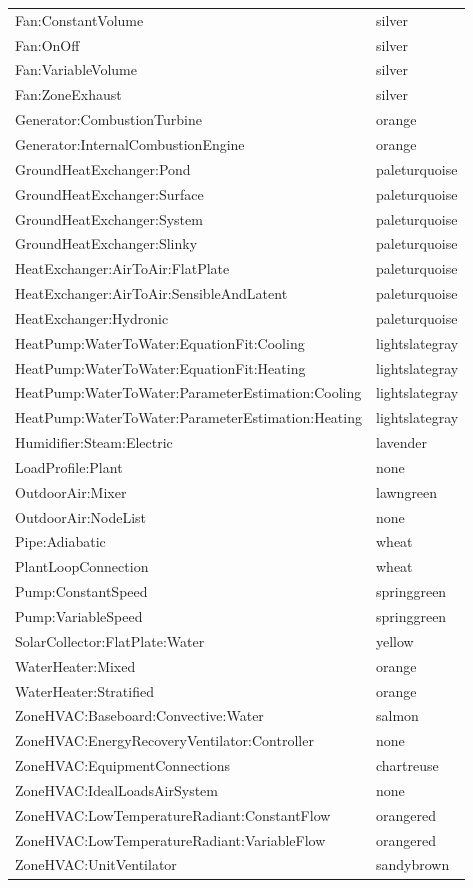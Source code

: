 \begin{longtable}[c]{@{}ll@{}}
Fan:ConstantVolume & silver \tabularnewline
Fan:OnOff & silver \tabularnewline
Fan:VariableVolume & silver \tabularnewline
Fan:ZoneExhaust & silver \tabularnewline
Generator:CombustionTurbine & orange \tabularnewline
Generator:InternalCombustionEngine & orange \tabularnewline
GroundHeatExchanger:Pond & paleturquoise \tabularnewline
GroundHeatExchanger:Surface & paleturquoise \tabularnewline
GroundHeatExchanger:System & paleturquoise \tabularnewline
GroundHeatExchanger:Slinky & paleturquoise \tabularnewline
HeatExchanger:AirToAir:FlatPlate & paleturquoise \tabularnewline
HeatExchanger:AirToAir:SensibleAndLatent & paleturquoise \tabularnewline
HeatExchanger:Hydronic & paleturquoise \tabularnewline
HeatPump:WaterToWater:EquationFit:Cooling & lightslategray \tabularnewline
HeatPump:WaterToWater:EquationFit:Heating & lightslategray \tabularnewline
HeatPump:WaterToWater:ParameterEstimation:Cooling & lightslategray \tabularnewline
HeatPump:WaterToWater:ParameterEstimation:Heating & lightslategray \tabularnewline
Humidifier:Steam:Electric & lavender \tabularnewline
LoadProfile:Plant & none \tabularnewline
OutdoorAir:Mixer & lawngreen \tabularnewline
OutdoorAir:NodeList & none \tabularnewline
Pipe:Adiabatic & wheat \tabularnewline
PlantLoopConnection & wheat \tabularnewline
Pump:ConstantSpeed & springgreen \tabularnewline
Pump:VariableSpeed & springgreen \tabularnewline
SolarCollector:FlatPlate:Water & yellow \tabularnewline
WaterHeater:Mixed & orange \tabularnewline
WaterHeater:Stratified & orange \tabularnewline
ZoneHVAC:Baseboard:Convective:Water & salmon \tabularnewline
ZoneHVAC:EnergyRecoveryVentilator:Controller & none \tabularnewline
ZoneHVAC:EquipmentConnections & chartreuse \tabularnewline
ZoneHVAC:IdealLoadsAirSystem & none \tabularnewline
ZoneHVAC:LowTemperatureRadiant:ConstantFlow & orangered \tabularnewline
ZoneHVAC:LowTemperatureRadiant:VariableFlow & orangered \tabularnewline
ZoneHVAC:UnitVentilator & sandybrown \tabularnewline
\bottomrule
\end{longtable}

